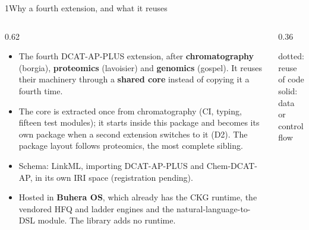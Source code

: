 \documentclass[aspectratio=169,11pt]{beamer}
\begin{document}
\begin{frame}{1\quad Why a fourth extension, and what it reuses}
\begin{columns}[T]
\begin{column}{0.62\textwidth}
\footnotesize
\begin{itemize}\setlength\itemsep{2pt}
  \item The fourth DCAT-AP-PLUS extension, after \textbf{chromatography} (borgia),
        \textbf{proteomics} (lavoisier) and \textbf{genomics} (gospel). It reuses their machinery
        through a \textbf{shared core} instead of copying it a fourth time.
  \item The core is extracted once from chromatography (CI, typing, fifteen test modules); it starts inside
        this package and becomes its own package when a second extension switches to it (D2).
        The package layout follows proteomics, the most complete sibling.
  \item Schema: LinkML, importing DCAT-AP-PLUS and Chem-DCAT-AP, in its own IRI space (registration pending).
  \item Hosted in \textbf{Buhera OS}, which already has the CKG runtime, the vendored HFQ and ladder engines and the
        natural-language-to-DSL module. The library adds no runtime.
\end{itemize}
\end{column}
\begin{column}{0.36\textwidth}
\centering
{}
\par\smallskip
{\scriptsize dotted: reuse of code\\ solid: data or control flow}
\end{column}
\end{columns}
\end{frame}
\end{document}
